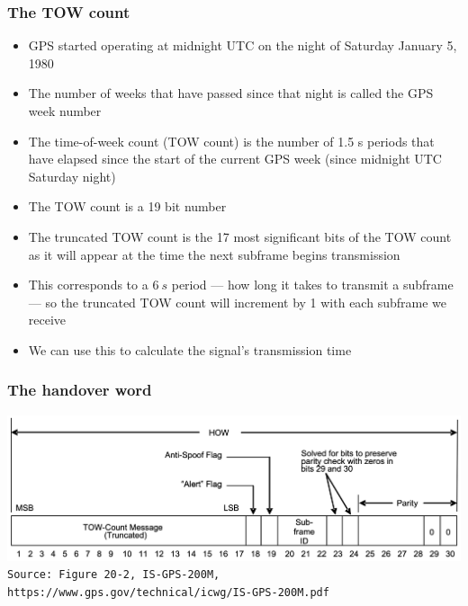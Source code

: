 \documentclass[aspectratio=169, xcolor=table]{beamer}
\begin{document}
\begin{frame}
    \frametitle{The TOW count}

    \begin{itemize}
        \item GPS started operating at midnight UTC on the night of Saturday January 5, 1980
        
        \item<2-> The number of weeks that have passed since that night is called the GPS week number
        
        \item<3-> The time-of-week count (TOW count) is the number of 1.5 s periods that have elapsed since the start of the current GPS week (since midnight UTC Saturday night)
        
        \item<4-> The TOW count is a 19 bit number
        
        \item<5-> The truncated TOW count is the 17 most significant bits of the TOW count as it will appear at the time the next subframe begins transmission
        
        \item<6-> This corresponds to a $\qty{6}{s}$ period — how long it takes to transmit a subframe — so the truncated TOW count will increment by 1 with each subframe we receive
        
        \item<7-> We can use this to calculate the signal's transmission time
    \end{itemize}
\end{frame}

\begin{frame}
    \frametitle{The handover word}

    \centering
    \includegraphics[width=\textwidth]{10 handover word.png} \\
    \texttt{\tiny{Source: Figure 20-2, IS-GPS-200M, https://www.gps.gov/technical/icwg/IS-GPS-200M.pdf}}
\end{frame}
\end{document}
